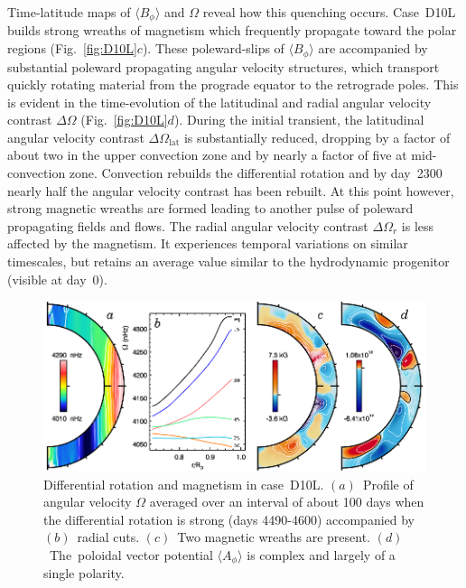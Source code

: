    Time-latitude maps of $\langle B_\phi \rangle$ and $\Omega$
reveal how this quenching occurs. 
Case~D10L builds strong wreaths of magnetism which frequently
propagate toward the polar regions (Fig.~\ref{fig:D10L}$c$).  
These poleward-slips of
$\langle B_\phi \rangle$ are accompanied by substantial poleward
propagating angular velocity structures, which transport quickly
rotating material from the prograde equator to the retrograde poles.
This is evident in the time-evolution of the latitudinal and radial
angular velocity contrast $\Delta \Omega$ (Fig.~\ref{fig:D10L}$d$).
During the initial transient, the latitudinal angular velocity
contrast  $\Delta \Omega_\mathrm{lat}$ is substantially reduced,
dropping by a factor of about two in the upper convection zone and by
nearly a factor of five at mid-convection zone.  Convection rebuilds
the differential rotation and by day~2300 nearly half the angular
velocity contrast has been rebuilt.  At this point however, strong
magnetic wreaths are formed leading to another pulse of poleward
propagating fields and flows.  The radial angular velocity contrast
$\Delta \Omega_r$ is less affected by the magnetism.  It experiences
temporal variations on similar timescales, but retains an average
value similar to the hydrodynamic progenitor (visible at day~0).

\begin{figure}[!t]
  \begin{center}
    \includegraphics{figs/chapter_8/mmc_vturf_10_LC_mean_flows.eps}
  \end{center}
  \caption[Differential rotation and magnetism in case~D10L]
          {Differential rotation and magnetism in case~D10L.
          $(a)$~Profile of angular velocity $\Omega$ averaged over an
          interval of about 100 days when the differential rotation is
          strong (days 4490-4600) accompanied by $(b)$~radial
          cuts.  $(c)$~Two magnetic wreaths are present.  
          $(d)$~The~poloidal vector potential $\langle A_\phi \rangle$
          is complex and largely of a single polarity.
          \label{fig:D10L mean flows}}
\end{figure}

